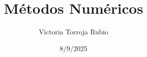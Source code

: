 \documentclass{report}
\begin{document}
\title{Métodos Numéricos}
\author{Victoria Torroja Rubio}
\date{8/9/2025}

\maketitle

\tableofcontents

\pagebreak



\end{document}

